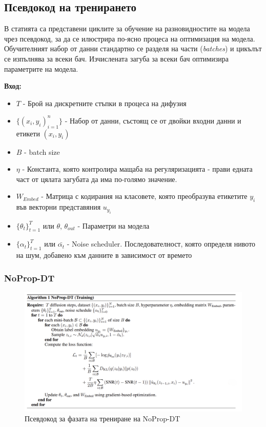 \documentclass[a4paper,11pt]{article}
\begin{document}
\subsection{Псевдокод на тренирането}

В статията са представени циклите за обучение на разновидностите на модела чрез псевдокод, за да се илюстрира по-ясно процеса на оптимизация на модела. Обучителният набор от данни стандартно се разделя на части (\emph{batches}) и цикълът се изпълнява за всеки бач. Изчислената загуба за всеки бач оптимизира параметрите на модела. 

\textbf{Вход:}
\begin{itemize}
    \item \(T\) - Брой на дискретните стъпки в процеса на дифузия 
    \item \(\{(x_{i}, y_{i})_{i=1}^{n}\}\) - Набор от данни, състоящ се от двойки входни данни и етикети $(x_{i}, y_{i})$
    \item \(B\) - batch size
    \item \(\eta\) - Константа, която контролира мащаба на регуляризацията - прави едната част от цялата загубата да има по-голямо значение.
    \item \(W_{Embed}\) - Матрица с кодирания на класовете, която преобразува етикетите \(y_{i}\) във векторни представяния \(u_{y_{i}}\)
    \item \(\{\theta_{t}\}_{t=1}^{T}\) или $\theta$, \(\theta_{out}\) - Параметри на модела
    \item \(\{\alpha_{t}\}_{t=1}^{T}\) или \(\bar{\alpha_{t}}\) - Noise scheduler. Последователност, която определя нивото на шум, добавено към данните в зависимост от времето
\end{itemize}

\subsubsection{NoProp-DT}

\begin{figure}[H]
    \centering
    \includegraphics[width=6.26in,keepaspectratio]{images/NoProp-DT Training Pseudocode.png}
    \caption{Псевдокод за фазата на трениране на NoProp-DT}
\end{figure}
\end{document}
